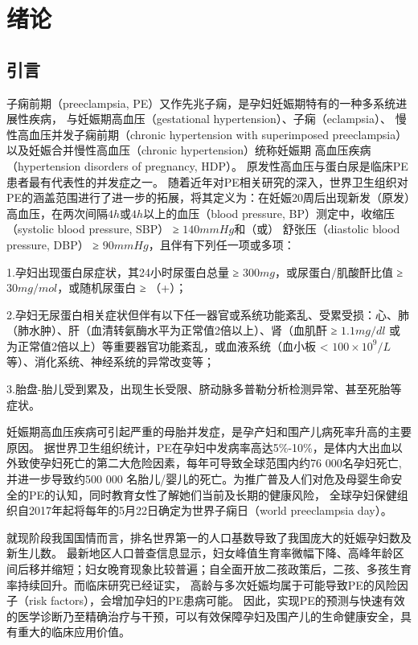 \chapter{绪论}

\section{引言}
子痫前期（preeclampsia, PE）又作先兆子痫，是孕妇妊娠期特有的一种多系统进展性疾病， 与妊娠期高血压（gestational hypertension）、子痫（eclampsia）、
慢性高血压并发子痫前期（chronic hypertension with superimposed preeclampsia）以及妊娠合并慢性高血压（chronic hypertension）统称妊娠期
高血压疾病（hypertension disorders of pregnancy, HDP）\cite{OAG9,HDASOM,2000s1}。
原发性高血压与蛋白尿是临床PE患者最有代表性的并发症之一。
随着近年对PE相关研究的深入，世界卫生组织对PE的涵盖范围进行了进一步的拓展，将其定义为：在妊娠20周后出现新发（原发）高血压，在两次间隔$4h$或$4h$以上的血压（blood pressure, BP）测定中，收缩压（systolic blood pressure, SBP） ≥ $140mmHg$和（或）
舒张压（diastolic blood pressure, DBP） ≥ $90mmHg$，且伴有下列任一项或多项\cite{OAG9,FIGO}：

1.孕妇出现蛋白尿症状，其24小时尿蛋白总量 ≥ $300mg$，或尿蛋白/肌酸酐比值 ≥ $30mg/mol$，或随机尿蛋白 ≥ （+）；

2.孕妇无尿蛋白相关症状但伴有以下任一器官或系统功能紊乱、受累受损：心、肺（肺水肿）、肝（血清转氨酶水平为正常值2倍以上）、肾（血肌酐 ≥ $1.1mg/dl$
或为正常值2倍以上）等重要器官功能紊乱，或血液系统（血小板 < $100 \times 10^{9}/L$等）、消化系统、神经系统的异常改变等；

3.胎盘-胎儿受到累及，出现生长受限、脐动脉多普勒分析检测异常、甚至死胎等症状。

妊娠期高血压疾病可引起严重的母胎并发症，是孕产妇和围产儿病死率升高的主要原因\cite{OAG9}。
据世界卫生组织统计，PE在孕妇中发病率高达5\%-10\%，是体内大出血以外致使孕妇死亡的第二大危险因素，每年可导致全球范围内约76 000名孕妇死亡,并进一步导致约500 000
名胎儿/婴儿的死亡\cite{DAM2015,LCT2006}。为推广普及人们对危及母婴生命安全的PE的认知，同时教育女性了解她们当前及长期的健康风险，
全球孕妇保健组织自2017年起将每年的5月22日确定为世界子痫日（world preeclampsia day）。

就现阶段我国国情而言，排名世界第一的人口基数导致了我国庞大的妊娠孕妇数及新生儿数\cite{nbs2022}。
最新地区人口普查信息显示，妇女峰值生育率微幅下降、高峰年龄区间后移并缩短；妇女晚育现象比较普遍；自全面开放二孩政策后，二孩、多孩生育率持续回升\cite{zjtjj2022}。而临床研究已经证实，
高龄与多次妊娠均属于可能导致PE的风险因子（risk factors），会增加孕妇的PE患病可能\cite{Duckitt2005,FIGO,Yogev2010,Poon2010,Lee2000,Coonrod1995,Robillard1993}。
因此，实现PE的预测与快速有效的医学诊断乃至精确治疗与干预，可以有效保障孕妇及围产儿的生命健康安全，具有重大的临床应用价值。
